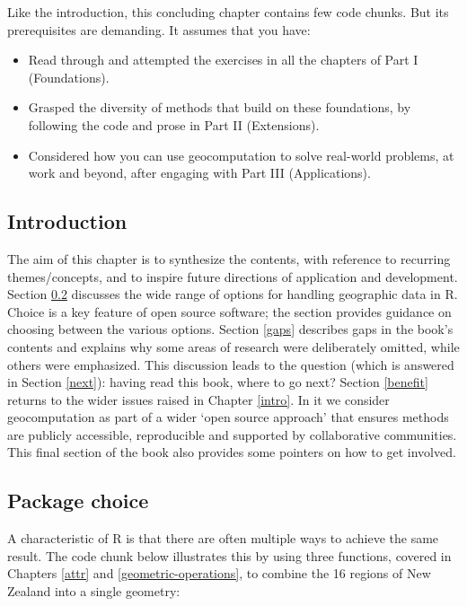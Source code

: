 \documentclass[]{krantz}
\providecommand{\tightlist}{%
  \setlength{\itemsep}{0pt}\setlength{\parskip}{0pt}}
\begin{document}
Like the introduction, this concluding chapter contains few code chunks.
But its prerequisites are demanding.
It assumes that you have:

\begin{itemize}
\tightlist
\item
  Read through and attempted the exercises in all the chapters of Part I (Foundations).
\item
  Grasped the diversity of methods that build on these foundations, by following the code and prose in Part II (Extensions).
\item
  Considered how you can use geocomputation to solve real-world problems, at work and beyond, after engaging with Part III (Applications).
\end{itemize}

\hypertarget{introduction-10}{%
\subsection{Introduction}\label{introduction-10}}

The aim of this chapter is to synthesize the contents, with reference to recurring themes/concepts, and to inspire future directions of application and development.
Section \ref{package-choice} discusses the wide range of options for handling geographic data in R.
Choice is a key feature of open source software; the section provides guidance on choosing between the various options.
Section \ref{gaps} describes gaps in the book's contents and explains why some areas of research were deliberately omitted, while others were emphasized.
This discussion leads to the question (which is answered in Section \ref{next}): having read this book, where to go next?
Section \ref{benefit} returns to the wider issues raised in Chapter \ref{intro}.
In it we consider geocomputation as part of a wider `open source approach' that ensures methods are publicly accessible, reproducible and supported by collaborative communities.
This final section of the book also provides some pointers on how to get involved.

\hypertarget{package-choice}{%
\subsection{Package choice}\label{package-choice}}

A characteristic of R is that there are often multiple ways to achieve the same result.
The code chunk below illustrates this by using three functions, covered in Chapters \ref{attr} and \ref{geometric-operations}, to combine the 16 regions of New Zealand into a single geometry:
\end{document}
